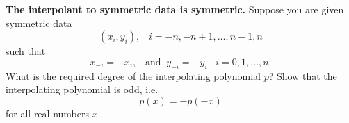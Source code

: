 \textbf{The interpolant to symmetric data is symmetric.} Suppose you
are given symmetric data \[(x_i, y_i), \;\;\; i= -n, -n+1, \dots, n-1,
n\] such that \[x_{-i} = -x_i, \;\;\; \text{and} \;\; y_{-i} = -y_i
\;\;\; i=0,1,\dots,n.\]
What is the required degree of the interpolating polynomial $p$? Show
that the interpolating polynomial is odd, i.e. \[p(x) = -p(-x)\] for
all real numbers $x$.
